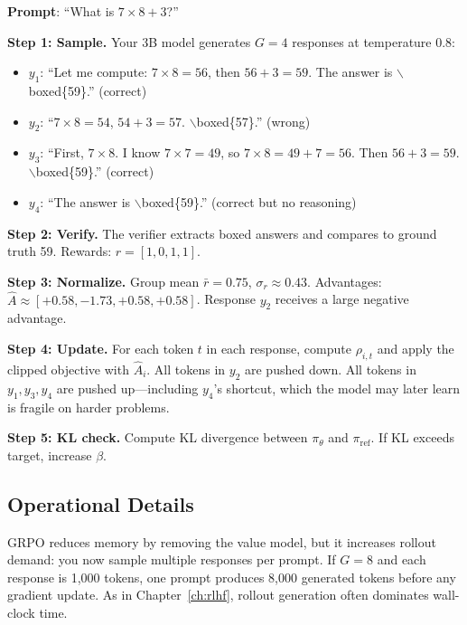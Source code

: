 \begin{tcolorbox}[colback=blue!5, colframe=blue!40, title=\textbf{Worked Example: One GRPO Step on Math}]
\textbf{Prompt}: ``What is $7 \times 8 + 3$?''

\textbf{Step 1: Sample.} Your 3B model generates $G=4$ responses at temperature 0.8:

\begin{itemize}[nosep]
  \item $y_1$: ``Let me compute: $7 \times 8 = 56$, then $56 + 3 = 59$. The answer is $\backslash$boxed\{59\}.'' (correct)
  \item $y_2$: ``$7 \times 8 = 54$, $54 + 3 = 57$. $\backslash$boxed\{57\}.'' (wrong)
  \item $y_3$: ``First, $7 \times 8$. I know $7 \times 7 = 49$, so $7 \times 8 = 49 + 7 = 56$. Then $56 + 3 = 59$. $\backslash$boxed\{59\}.'' (correct)
  \item $y_4$: ``The answer is $\backslash$boxed\{59\}.'' (correct but no reasoning)
\end{itemize}

\textbf{Step 2: Verify.} The verifier extracts boxed answers and compares to ground truth 59. Rewards: $r = [1, 0, 1, 1]$.

\textbf{Step 3: Normalize.} Group mean $\bar{r} = 0.75$, $\sigma_r \approx 0.43$. Advantages: $\hat{A} \approx [+0.58, -1.73, +0.58, +0.58]$. Response $y_2$ receives a large negative advantage.

\textbf{Step 4: Update.} For each token $t$ in each response, compute $\rho_{i,t}$ and apply the clipped objective with $\hat{A}_i$. All tokens in $y_2$ are pushed down. All tokens in $y_1, y_3, y_4$ are pushed up---including $y_4$'s shortcut, which the model may later learn is fragile on harder problems.

\textbf{Step 5: KL check.} Compute KL divergence between $\pi_\theta$ and $\pi_{\text{ref}}$. If KL exceeds target, increase $\beta$.
\end{tcolorbox}

\subsection{Operational Details}

GRPO reduces memory by removing the value model, but it increases rollout demand: you now sample multiple responses per prompt. If $G=8$ and each response is 1{,}000 tokens, one prompt produces 8{,}000 generated tokens before any gradient update. As in Chapter~\ref{ch:rlhf}, rollout generation often dominates wall-clock time.

